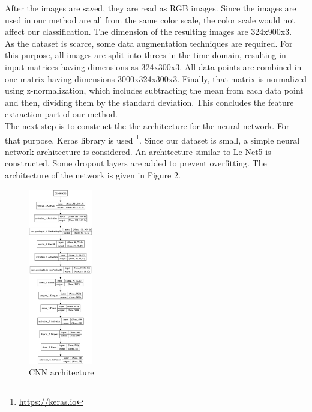 \documentclass[acmtog, authorversion]{acmart}
\begin{document}
After the images are saved, they are read as RGB images. Since the images are used in our method are all from the same color scale, 
the color scale would not affect our classification. The dimension of the resulting images are 324x900x3. \\
As the dataset is scarce, some data augmentation techniques are required. For this purpose, all images are split into threes in the time domain, resulting in 
input matrices having dimensions as 324x300x3. All data points are combined in one matrix having dimensions 3000x324x300x3. Finally, that matrix is normalized
using z-normalization, which includes subtracting the mean from each data point and then, dividing them by the standard deviation. This concludes the feature
extraction part of our method.\\
The next step is to construct the the architecture for the neural network. For that purpose, Keras library is used \footnote{\url{https://keras.io}}. Since
our dataset is small, a simple neural network architecture is considered. An architecture similar to Le-Net5 \cite{lecun2015lenet} is constructed.
 Some dropout layers are added to prevent overfitting. The architecture of the network is given in Figure 2. \\
\begin{figure}[h!]
  \centering
  \includegraphics[width=0.25\textwidth]{model.png}
  \caption{CNN architecture}
  \end{figure}
\end{document}
